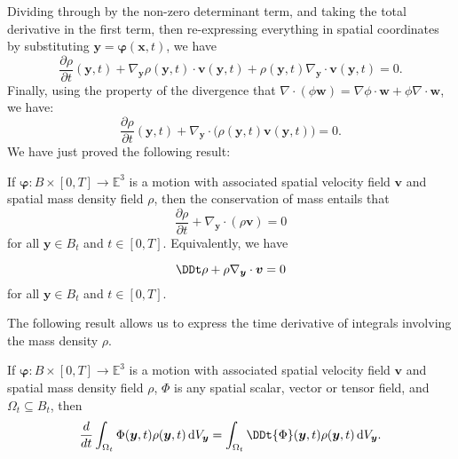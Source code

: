 \documentclass[
  letterpaper,
  DIV=11,
  numbers=noendperiod]{scrreprt}
\theoremstyle{plain}
\theoremstyle{remark}
\begin{document}
Dividing through by the non-zero determinant term, and taking the total
derivative in the first term, then re-expressing everything in spatial
coordinates by substituting
\({\boldsymbol{y}}={\boldsymbol{\varphi}}({\boldsymbol{x}},t)\), we have
\[\frac{\partial\rho}{\partial t}({\boldsymbol{y}},t) + \nabla_{\boldsymbol{y}}\rho({\boldsymbol{y}},t)\cdot{\boldsymbol{v}}({\boldsymbol{y}},t)+\rho({\boldsymbol{y}},t)\nabla_{\boldsymbol{y}}\cdot{\boldsymbol{v}}({\boldsymbol{y}},t)= 0.\]
Finally, using the property of the divergence that
\(\nabla\cdot(\phi{\boldsymbol{w}}) = \nabla\phi\cdot{\boldsymbol{w}}+\phi\nabla\cdot{\boldsymbol{w}}\),
we have:
\[\frac{\partial\rho}{\partial t}({\boldsymbol{y}},t) + \nabla_{\boldsymbol{y}}\cdot\big(\rho({\boldsymbol{y}},t){\boldsymbol{v}}({\boldsymbol{y}},t)\big)= 0.\]
We have just proved the following result:

If \({\boldsymbol{\varphi}}:B\times[0,T]\to{\mathbb{E}}^3\) is a motion
with associated spatial velocity field \({\boldsymbol{v}}\) and spatial
mass density field \(\rho\), then the conservation of mass entails that
\[\frac{\partial \rho}{\partial t} +\nabla_{\boldsymbol{y}}\cdot(\rho{\boldsymbol{v}}) = 0\]
for all \({\boldsymbol{y}}\in B_t\) and \(t\in[0,T]\). Equivalently, we
have

\[\DDt\rho +\rho\nabla_{\boldsymbol{y}}\cdot{\boldsymbol{v}}= 0\] for
all \({\boldsymbol{y}}\in B_t\) and \(t\in[0,T]\).

The following result allows us to express the time derivative of
integrals involving the mass density \(\rho\).

\label{prop:TimeDerivativeMassIntegrals}{} If
\({\boldsymbol{\varphi}}:B\times[0,T]\to{\mathbb{E}}^3\) is a motion
with associated spatial velocity field \({\boldsymbol{v}}\) and spatial
mass density field \(\rho\), \(\Phi\) is any spatial scalar, vector or
tensor field, and \(\Omega_t\subseteq B_t\), then
\[\frac{d}{dt}\int_{\Omega_t}\Phi({\boldsymbol{y}},t)\rho({\boldsymbol{y}},t){\,{\mathrm{d}}V_{{\boldsymbol{y}}}}=\int_{\Omega_t}\DDt{\Phi}({\boldsymbol{y}},t)\rho({\boldsymbol{y}},t){\,{\mathrm{d}}V_{{\boldsymbol{y}}}}.\]
\end{document}
